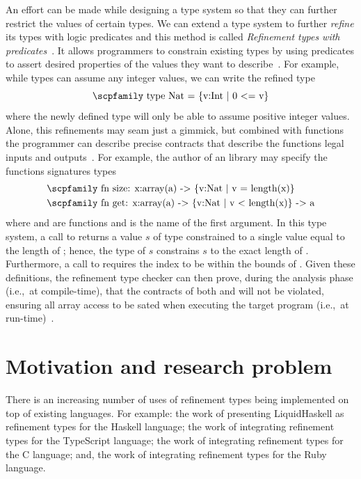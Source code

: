 \documentclass[
  oneside,
  english,
  coorientadorbanca,
  noabntexcite
]{ufsc-thesis-rn46-2019}
\newcommand{\codett}[1]{\text{\scpfamily#1}}
\newcommand{\code}[1]{\text{\scpfamily\setlength\spaceskip{0.35em}#1}}
\begin{document}
An effort can be made while designing a type system so that they can further restrict the values of certain types.
We can extend a type system to further \textit{refine} its types with logic predicates and this method is called \textit{Refinement types with predicates}~\cite{jhala2020tutorial}.
It allows programmers to constrain existing types by using predicates to assert desired properties of the values they want to describe~\cite{jhala2020tutorial}.
For example, while \codett{Int} types can assume any integer values, we can write the refined type
\begin{equation*}
  \codett{type Nat = \{v:Int | 0 <= v\}}
\end{equation*}
where the newly defined type \codett{Nat} will only be able to assume positive integer values.
Alone, this refinements may seam just a gimmick, but combined with functions the programmer can describe precise contracts that describe the functions legal inputs and outputs~\cite{jhala2020tutorial}.
For example, the author of an \codett{array} library may specify the functions signatures types
\begin{equation*}
  \begin{aligned}
     & \codett{fn size: x:array(a) -> \{v:Nat | v = length(x)\}}      \\
     & \codett{fn  get: x:array(a) -> \{v:Nat | v < length(x)\} -> a} \\
  \end{aligned}
\end{equation*}
where \codett{size} and \codett{get} are functions and \codett{x} is the name of the first argument.
In this type system, a call to \code{size(x)} returns a value $s$ of type \codett{Nat} constrained to a single value equal to the length of \codett{x}; hence, the type of $s$ constrains $s$ to the exact length of \codett{x}.
Furthermore, a call to \code{get(x, i)} requires the index \codett{i} to be within the bounds of \codett{x}.
Given these definitions, the refinement type checker can then prove, during the analysis phase (i.e.,\ at compile-time), that the contracts of both \codett{size} and \codett{get} will not be violated, ensuring all array access to be sated when executing the target program (i.e.,\ at run-time)~\cite{jhala2020tutorial}.

\section{Motivation and research problem}

There is an increasing number of uses of refinement types being implemented on top of existing languages.
For example: the work of \textcite{vazou2014liquidhaskell} presenting LiquidHaskell as refinement types for the Haskell language; the work of \textcite{vekris2016refinementtypescript} integrating refinement types for the TypeScript language; the work of \textcite{sammler2021refinedc} integrating refinement types for the C language; and, the work of \textcite{vazou2018refinementruby} integrating refinement types for the Ruby language.
\end{document}
